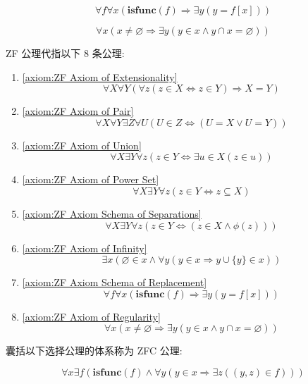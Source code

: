 \begin{axiom}
    \label {axiom:ZF Axiom Schema of Replacement}
    \[
        \forall f \forall x (\mathbf{isfunc} (f) \Rightarrow \exists y (y = f[x]))
    \]
\end{axiom}

\begin{axiom}
    \label {axiom:ZF Axiom of Regularity}
    \[
        \forall x (x \neq \varnothing \Rightarrow \exists y (y \in x \land y \cap x = \varnothing))
    \]
\end{axiom}

ZF 公理代指以下 8 条公理:

\begin{enumerate}
    \item \ref{axiom:ZF Axiom of Extensionality}
    \[
        \forall X \forall Y (\forall z (z \in X \Leftrightarrow z \in Y) \Rightarrow X = Y)
    \]
    \item \ref{axiom:ZF Axiom of Pair}
    \[
        \forall X \forall Y \exists Z \forall U (U \in Z \Leftrightarrow (U = X \lor U = Y))
    \]
    \item \ref{axiom:ZF Axiom of Union}
    \[
        \forall X \exists Y \forall z (z \in Y \Leftrightarrow \exists u \in X (z \in u))
    \]
    \item \ref{axiom:ZF Axiom of Power Set}
    \[
        \forall X \exists Y \forall z (z \in Y \Leftrightarrow z \subseteq X)
    \]
    \item \ref{axiom:ZF Axiom Schema of Separations}
    \[
        \forall X \exists Y \forall z (z \in Y \Leftrightarrow (z \in X \land \phi (z)))
    \]
    \item \ref{axiom:ZF Axiom of Infinity}
    \[
        \exists x (\varnothing \in x \land \forall y (y \in x \Rightarrow y \cup \{y\} \in x))
    \]
    \item \ref{axiom:ZF Axiom Schema of Replacement}
    \[
        \forall f \forall x (\mathbf{isfunc} (f) \Rightarrow \exists y (y = f[x]))
    \]
    \item \ref{axiom:ZF Axiom of Regularity}
    \[
        \forall x (x \neq \varnothing \Rightarrow \exists y (y \in x \land y \cap x = \varnothing))
    \]
\end{enumerate}

囊括以下选择公理的体系称为 ZFC 公理:

\begin{axiom}
    \label {axiom:ZF Axiom of Choice}
    \[
        \forall x \exists f (\mathbf{isfunc} (f) \land \forall y (y \in x \Rightarrow \exists z ((y,z) \in f)))
    \]
\end{axiom}


